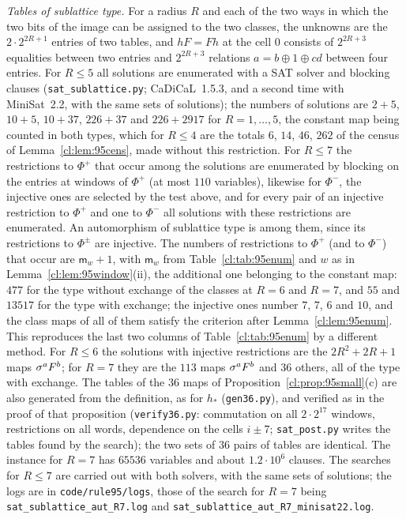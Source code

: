 \emph{Tables of sublattice type.} For a radius $R$ and each of the two ways in which the two bits of the image can be assigned to the two classes, the unknowns are the $2\cdot2^{2R+1}$ entries of two tables, and $hF=Fh$ at the cell $0$ consists of $2^{2R+3}$ equalities between two entries and $2^{2R+3}$ relations $a=b\oplus1\oplus cd$ between four entries. For $R\le5$ all solutions are enumerated with a SAT solver and blocking clauses (\texttt{sat\_sublattice.py}; CaDiCaL~1.5.3, and a second time with MiniSat~2.2, with the same sets of solutions); the numbers of solutions are $2+5$, $10+5$, $10+37$, $226+37$ and $226+2917$ for $R=1,\dots,5$, the constant map being counted in both types, which for $R\le4$ are the totals $6$, $14$, $46$, $262$ of the census of Lemma~\ref{cl:lem:95cens}, made without this restriction. For $R\le7$ the restrictions to $\Phi^+$ that occur among the solutions are enumerated by blocking on the entries at windows of $\Phi^+$ (at most $110$ variables), likewise for $\Phi^-$, the injective ones are selected by the test above, and for every pair of an injective restriction to $\Phi^+$ and one to $\Phi^-$ all solutions with these restrictions are enumerated. An automorphism of sublattice type is among them, since its restrictions to $\Phi^\pm$ are injective. The numbers of restrictions to $\Phi^+$ (and to $\Phi^-$) that occur are $\mathsf m_w+1$, with $\mathsf m_w$ from Table~\ref{cl:tab:95enum} and $w$ as in Lemma~\ref{cl:lem:95window}(ii), the additional one belonging to the constant map: $477$ for the type without exchange of the classes at $R=6$ and $R=7$, and $55$ and $13517$ for the type with exchange; the injective ones number $7$, $7$, $6$ and $10$, and the class maps of all of them satisfy the criterion after Lemma~\ref{cl:lem:95enum}. This reproduces the last two columns of Table~\ref{cl:tab:95enum} by a different method. For $R\le6$ the solutions with injective restrictions are the $2R^2+2R+1$ maps $\sigma^aF^b$; for $R=7$ they are the $113$ maps $\sigma^aF^b$ and $36$ others, all of the type with exchange. The tables of the $36$ maps of Proposition~\ref{cl:prop:95small}(c) are also generated from the definition, as for $h_{\ast}$ (\texttt{gen36.py}), and verified as in the proof of that proposition (\texttt{verify36.py}: commutation on all $2\cdot2^{17}$ windows, restrictions on all words, dependence on the cells $i\pm7$; \texttt{sat\_post.py} writes the tables found by the search); the two sets of $36$ pairs of tables are identical. The instance for $R=7$ has $65536$ variables and about $1.2\cdot10^6$ clauses. The searches for $R\le7$ are carried out with both solvers, with the same sets of solutions; the logs are in \texttt{code/rule95/logs}, those of the search for $R=7$ being \texttt{sat\_sublattice\_aut\_R7.log} and \texttt{sat\_sublattice\_aut\_R7\_minisat22.log}.

